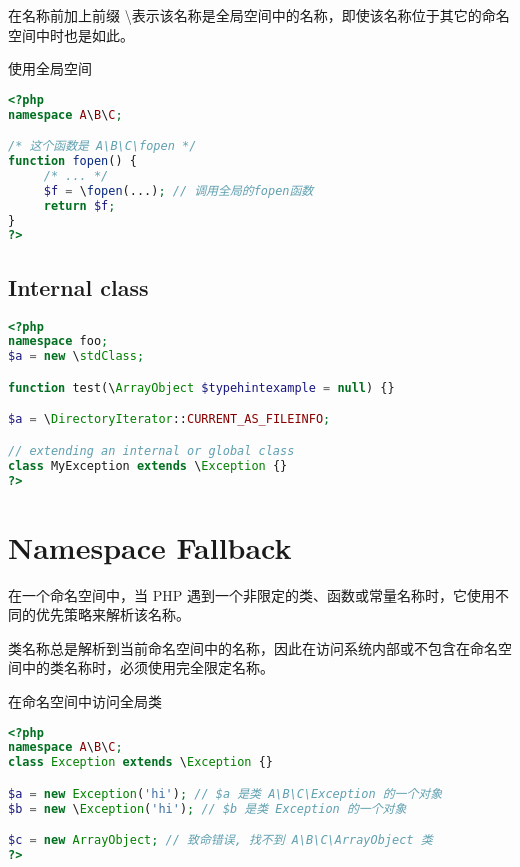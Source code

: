 在名称前加上前缀 \textbackslash 表示该名称是全局空间中的名称，即使该名称位于其它的命名空间中时也是如此。



\begin{example}
使用全局空间
\begin{lstlisting}[language=PHP]
<?php
namespace A\B\C;

/* 这个函数是 A\B\C\fopen */
function fopen() { 
     /* ... */
     $f = \fopen(...); // 调用全局的fopen函数
     return $f;
} 
?>
\end{lstlisting}
\end{example}




\section{Internal class}


\begin{lstlisting}[language=PHP]
<?php
namespace foo;
$a = new \stdClass;

function test(\ArrayObject $typehintexample = null) {}

$a = \DirectoryIterator::CURRENT_AS_FILEINFO;

// extending an internal or global class
class MyException extends \Exception {}
?>
\end{lstlisting}

\chapter{Namespace Fallback}


在一个命名空间中，当 PHP 遇到一个非限定的类、函数或常量名称时，它使用不同的优先策略来解析该名称。

类名称总是解析到当前命名空间中的名称，因此在访问系统内部或不包含在命名空间中的类名称时，必须使用完全限定名称。


\begin{example}
在命名空间中访问全局类
\begin{lstlisting}[language=PHP]
<?php
namespace A\B\C;
class Exception extends \Exception {}

$a = new Exception('hi'); // $a 是类 A\B\C\Exception 的一个对象
$b = new \Exception('hi'); // $b 是类 Exception 的一个对象

$c = new ArrayObject; // 致命错误, 找不到 A\B\C\ArrayObject 类
?>
\end{lstlisting}
\end{example}


